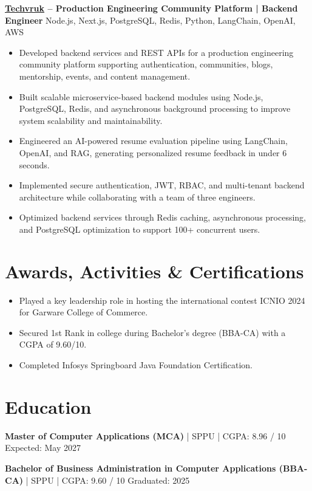 \documentclass[a4paper,10pt]{article}
\begin{document}
\textbf{\href{https://techvruk.com}{Techvruk} -- Production Engineering Community Platform | Backend Engineer} \hfill Node.js, Next.js, PostgreSQL, Redis, Python, LangChain, OpenAI, AWS

\begin{itemize}[leftmargin=*]
    \item Developed backend services and REST APIs for a production engineering community platform supporting authentication, communities, blogs, mentorship, events, and content management.
    \item Built scalable microservice-based backend modules using Node.js, PostgreSQL, Redis, and asynchronous background processing to improve system scalability and maintainability.
    \item Engineered an AI-powered resume evaluation pipeline using LangChain, OpenAI, and RAG, generating personalized resume feedback in under 6 seconds.
    \item Implemented secure authentication, JWT, RBAC, and multi-tenant backend architecture while collaborating with a team of three engineers.
    \item Optimized backend services through Redis caching, asynchronous processing, and PostgreSQL optimization to support 100+ concurrent users.
\end{itemize}

\section*{Awards, Activities \& Certifications}

\begin{itemize}[leftmargin=*]
    \item Played a key leadership role in hosting the international contest ICNIO 2024 for Garware College of Commerce.
    \item Secured 1st Rank in college during Bachelor's degree (BBA-CA) with a CGPA of 9.60/10.
    \item Completed Infosys Springboard Java Foundation Certification.
\end{itemize}

\section*{Education}

\textbf{Master of Computer Applications (MCA)} | SPPU | CGPA: 8.96 / 10 \hfill Expected: May 2027

\vspace{4pt}

\textbf{Bachelor of Business Administration in Computer Applications (BBA-CA)} | SPPU | CGPA: 9.60 / 10 \hfill Graduated: 2025 
\end{document}

